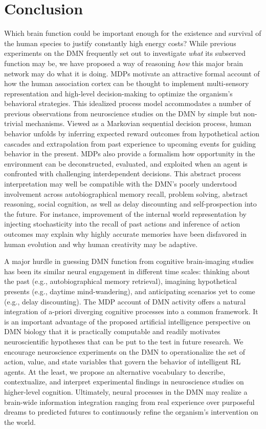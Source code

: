 \documentclass[10pt,letterpaper]{article}
\begin{document}
\section{Conclusion}
Which brain function could be important enough
for the existence and survival of the human species
to justify constantly high energy costs?
While previous experiments on the DMN frequently set out to investigate
\textit{what} its subserved function may be,
we have proposed a way of reasoning
\textit{how} this major brain network may do what it is doing.
%
MDPs motivate an attractive
formal account of how the human association cortex
can be thought to implement multi-sensory representation and high-level decision-making to
optimize the organism's behavioral strategies.
This idealized process model accommodates
a number of previous observations from neuroscience studies on the
DMN by simple but non-trivial mechanisms.
%
Viewed as a Markovian sequential decision process,
human behavior unfolds by inferring expected reward outcomes
from hypothetical action cascades
and extrapolation from past experience to
upcoming events for guiding behavior in the present.
MDPs also provide a formalism how
opportunity in the environment can be deconstructed, evaluated, and exploited
when an agent is confronted with challenging interdependent decisions.
%
This abstract process interpretation may well be compatible with the DMN's
poorly understood involvement across
autobiographical memory recall, problem solving,
abstract reasoning, social cognition,
as well as delay discounting and self-prospection into the future.
%
For instance, improvement of the internal world representation
by injecting stochasticity into the recall of past
actions and inference of action outcomes may explain why
highly accurate memories have been disfavored in human evolution
and why human creativity may be adaptive.




A major hurdle in guessing DMN function from cognitive brain-imaging studies has been its similar neural engagement in different time scales: thinking about the past (e.g., autobiographical memory retrieval),
imagining hypothetical presents (e.g., daytime mind-wandering), and
anticipating scenarios yet to come (e.g., delay discounting).
The MDP account of DMN activity offers a natural integration of a-priori diverging
cognitive processes into a common framework.
%
It is an important advantage of the proposed artificial intelligence perspective
on DMN biology that it is practically computable and
readily motivates neuroscientific hypotheses that can be put to the test in future research.
%
We encourage neuroscience experiments on the DMN to operationalize
the set of action, value, and state variables that govern
the behavior of intelligent RL agents.
%
At the least, we propose an alternative vocabulary to
describe, contextualize, and interpret experimental findings in neuroscience studies
on higher-level cognition.
%
Ultimately,
neural processes in the DMN may realize a brain-wide information integration
ranging from real experience over purposeful dreams to predicted futures
to continuously refine the organism's intervention on the world.
\end{document}
